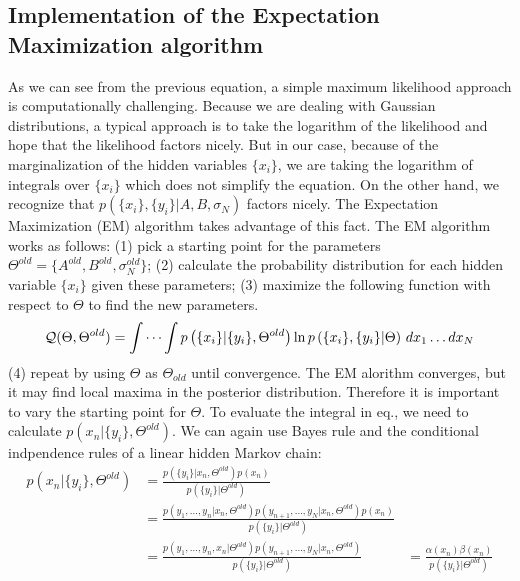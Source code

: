 \documentclass[%
 reprint,
 amsmath,amssymb,
 aps,
]{revtex4-1}
\begin{document}
\subsection{Implementation of the Expectation Maximization algorithm}
As we can see from the previous equation, a simple maximum likelihood approach is computationally challenging.  Because we are dealing with Gaussian distributions, a typical approach is to take the logarithm of the likelihood and hope that the likelihood factors nicely.  But in our case, because of the marginalization of the hidden variables $\{x_{i}\}$, we are taking the logarithm of integrals over $\{x_{i}\}$ which does not simplify the equation.  On the other hand, we recognize that $p\left( \{x_{i}\},\{y_{i}\}|A,B,\sigma_{N}\right)$ factors nicely.  The Expectation Maximization (EM) algorithm takes advantage of this fact.  The EM algorithm works as follows: (1) pick a starting point for the parameters $\Theta^{old} = \{A^{old},B^{old},\sigma_{N}^{old}\}$; (2) calculate the probability distribution for each hidden variable $\{x_{i}\}$ given these parameters; (3) maximize the following function with respect to $\Theta$ to find the new parameters.
\begin{equation}
	\mathcal{Q}(\Theta,\Theta^{old}) = \idotsint p\left( \{x_{i}\}|\{y_{i}\},\Theta^{old}\right)\ln p\left( \{x_{i}\},\{y_{i}\}|\Theta\right)\,dx_1 \dots dx_N
\end{equation}
(4) repeat by using $\Theta$ as $\Theta_{old}$ until convergence.  The EM alorithm converges, but it may find local maxima in the posterior distribution.  Therefore it is important to vary the starting point for $\Theta$.  To evaluate the integral in eq., we need to calculate $p\left( x_{n}|\{y_{i}\},\Theta^{old}\right)$.  We can again use Bayes rule and the conditional indpendence rules of a linear hidden Markov chain:
\begin{equation}\label{margxn}
	\begin{aligned}
	p\left( x_{n}|\{y_{i}\},\Theta^{old}\right)&=\frac{p\left( \{y_{i}\}|x_{n},\Theta^{old}\right)p(x_{n})}{p(\{y_{i}\}|\Theta^{old})}\\
	&=\frac{p(y_{1},\dots,y_{n}|x_{n},\Theta^{old})p(y_{n+1},\dots,y_{N}|x_{n},\Theta^{old})p(x_{n})}{p(\{y_{i}\}|\Theta^{old})}\\
	&=\frac{p(y_{1},\dots,y_{n},x_{n}|\Theta^{old})p(y_{n+1},\dots,y_{N}|x_{n},\Theta^{old})}{p(\{y_{i}\}|\Theta^{old})}
	&=\frac{\alpha(x_{n})\beta(x_{n})}{p(\{y_{i}\}|\Theta^{old})}
	\end{aligned}
\end{equation}
\end{document}
